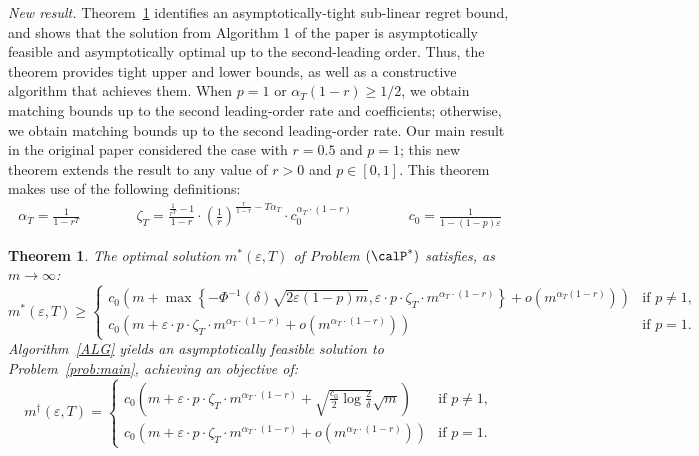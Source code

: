 \documentclass[11pt]{article}
\newtheorem{theorem}{Theorem}[] %
\begin{document}
\textit{New result.}
Theorem~\ref{thm:main_R1} identifies an asymptotically-tight sub-linear regret bound, and shows that the solution from Algorithm 1 of the paper is asymptotically feasible and asymptotically optimal up to the second-leading order. Thus, the theorem provides tight upper and lower bounds, as well as a constructive algorithm that achieves them. When $p=1$ or $\alpha_T(1-r)\geq1/2$, we obtain matching bounds up to the second leading-order rate and coefficients; otherwise, we obtain matching bounds up to the second leading-order rate. Our main result in the original paper considered the case with $r=0.5$ and $p=1$; this new theorem extends the result to any value of $r>0$ and $p\in[0,1]$. This theorem makes use of the following definitions:
\begin{align*}
	\alpha_T=\frac{1}{1-r^T}\qquad\qquad
	\zeta_T=\frac{\frac{1}{r^T}-1}{1-r}\cdot\left(\frac{1}{r}\right)^{\frac{r}{1-r}-T\alpha_T}\cdot c_0^{\alpha_T\cdot(1-r)} \qquad\qquad c_0 = \frac{1}{1-(1-p)\varepsilon}
\end{align*}
\setcounter{theorem}{0}
\begin{theorem}\label{thm:main_R1}
	The optimal solution $m^*(\varepsilon, T)$ of Problem $(\calP^*)$ satisfies, as $m \to \infty$:
    $$m^*(\varepsilon, T)\geq \begin{cases}
      c_0\left(m +\max\left\{-\Phi^{-1}(\delta)\sqrt{2\varepsilon(1-p)m}, \varepsilon \cdot p \cdot \zeta_T\cdot m^{\alpha_T\cdot(1-r)}\right\}+o\left(m^{\alpha_T(1-r)}\right)\right) & \text{if }p \neq 1,\\
          c_0\left(m +\varepsilon\cdot p\cdot\zeta_T\cdot m^{\alpha_T\cdot(1-r)} +  o\left(m^{\alpha_T\cdot(1-r)}\right)\right) & \text{if }p=1.
      \end{cases}$$
	Algorithm~\ref{ALG} yields an asymptotically feasible solution to Problem~\eqref{prob:main}, achieving an objective of:
    $$m^\dagger(\varepsilon,T)=\begin{cases}
        c_0\left( m+\varepsilon\cdot p\cdot \zeta_T \cdot m^{\alpha_T\cdot(1-r)} +  \sqrt{\frac{c_0}{2}\log \frac{2}{\delta}}\sqrt{m}\right) &  \text{if }p\neq 1,\\
   c_0\left( m+\varepsilon\cdot p\cdot \zeta_T \cdot m^{\alpha_T\cdot(1-r)} +  o\left(m^{\alpha_T\cdot(1-r)}\right)\right) &  \text{if }p=1.
    \end{cases}$$
\end{theorem}
\end{document}

